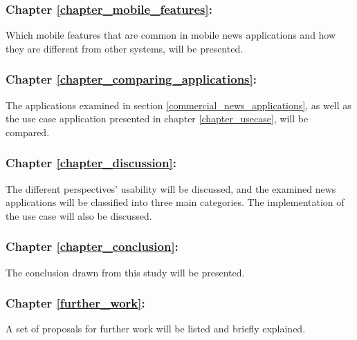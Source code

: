 \subsubsection{Chapter \ref{chapter_mobile_features}: }
Which mobile features that are common in mobile news applications and how they are different from other systems, will be presented.

\subsubsection{Chapter \ref{chapter_comparing_applications}: }
The applications examined in section \ref{commercial_news_applications}, as well as the use case application presented in chapter \ref{chapter_usecase}, will be compared.

\subsubsection{Chapter \ref{chapter_discussion}: }
The different perspectives' usability will be discussed, and the examined news applications will be classified into three main categories. The implementation of the use case will also be discussed.

\subsubsection{Chapter \ref{chapter_conclusion}: }
The conclusion drawn from this study will be presented.

\subsubsection{Chapter \ref{further_work}: }
A set of proposals for further work will be listed and briefly explained.